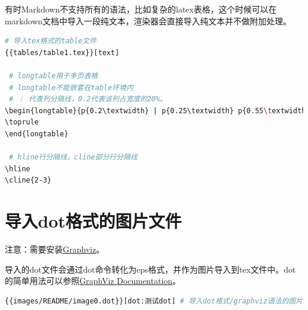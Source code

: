 \documentclass[export, 12pt, letterpaper]{ctexrep}
\newenvironment{shadedquotation}
 {\begin{shaded*}
  \quoting[leftmargin=5pt, rightmargin=5pt, vskip=0pt]
 }
 {\endquoting
 \end{shaded*}
}
\begin{document}
有时Markdown不支持所有的语法，比如复杂的latex表格，这个时候可以在markdown文档中导入一段纯文本，渲染器会直接导入纯文本并不做附加处理。

\begin{lstlisting}[language=Bash]
 # 导入tex格式的table文件
{{tables/table1.tex}}[text]

 # longtable用于多页表格
 # longtable不能嵌套在table环境内
 # ｜ 代表列分隔线，0.2代表该列占宽度的20%。
\begin{longtable}{p{0.2\textwidth} | p{0.25\textwidth} p{0.55\textwidth}}
\toprule
\end{longtable}

 # hline行分隔线，cline部分行分隔线
\hline
\cline{2-3}
\end{lstlisting}




\section{导入dot格式的图片文件}

\begin{shadedquotation}
\noindent
注意：需要安装\href{https://graphviz.org/download/}{Graphviz}。
\end{shadedquotation}


导入的dot文件会通过dot命令转化为eps格式，并作为图片导入到tex文件中。dot的简单用法可以参照\href{https://graphviz.org/documentation/}{GraphViz Documentation}。

\begin{lstlisting}[language=Bash]
{{images/README/image0.dot}}[dot:测试dot] # 导入dot格式/graphviz语法的图片文件，并用“测试dot”作为标题。
\end{lstlisting}
\end{document}
